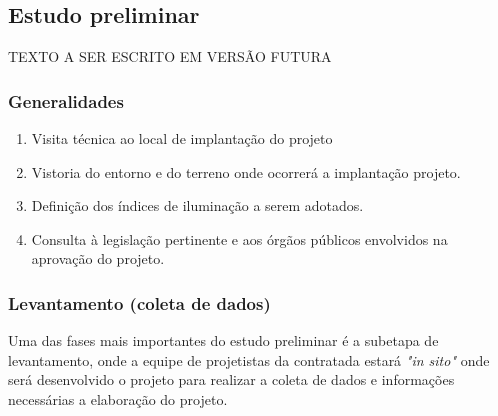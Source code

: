 \subsection{Estudo preliminar} \label{subsection: etapa-estudo preliminar}

TEXTO A SER ESCRITO EM VERSÃO FUTURA

\subsubsection{Generalidades}

	\begin{enumerate}\label{subsection: EP-generalidades}
		\item Visita técnica ao local de implantação do projeto

		\item Vistoria do entorno e do terreno onde ocorrerá a implantação projeto.
		
		\item Definição dos índices de iluminação a serem adotados.
		
		\item Consulta à legislação pertinente e aos órgãos públicos envolvidos na aprovação do projeto.
	\end{enumerate}

\subsubsection{Levantamento (coleta de dados)}

Uma das fases mais importantes do estudo preliminar é a subetapa de levantamento, onde a equipe de projetistas da contratada estará \textit{"in sito"} onde será desenvolvido o projeto para realizar a coleta de dados e informações necessárias a elaboração do projeto.


